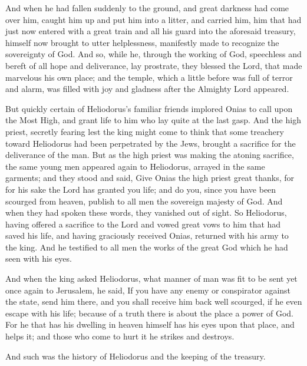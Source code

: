 {And when he had fallen suddenly to the ground, and great darkness had come over him,
{} caught him up and put him into a litter,
and carried him, him that had just now entered with a great train and all his guard into the aforesaid treasury, himself now brought to utter helplessness, manifestly made to recognize the sovereignty of God.
And so, while he, through the working of God, speechless and bereft of all hope and deliverance, lay prostrate,
they blessed the Lord, that made marvelous his own place; and the temple, which a little before was full of terror and alarm, was filled with joy and gladness after the Almighty Lord appeared.
\par }{\PP {}But quickly certain of Heliodorus’s familiar friends implored Onias to call upon the Most High, and grant life to him who lay quite at the last gasp.
And the high priest, secretly fearing lest the king might come to think that some treachery toward Heliodorus had been perpetrated by the Jews, brought a sacrifice for the deliverance of the man.
But as the high priest was making the atoning sacrifice, the same young men appeared again to Heliodorus, arrayed in the same garments; and they stood and said, Give Onias the high priest great thanks, for for his sake the Lord has granted you life;
and do you, since you have been scourged from heaven, publish to all men the sovereign majesty of God. And when they had spoken these words, they vanished out of sight.
So Heliodorus, having offered a sacrifice to the Lord and vowed
 great vows to him that had saved his life, and having graciously received Onias, returned with his army to the king.
And he testified to all men the works of the
 great God which he had seen with his eyes.
\par }{\PP {}And when the king asked Heliodorus, what manner of man was fit to be sent yet once again to Jerusalem, he said,
If you have any enemy or conspirator against the state, send him there, and you shall receive him back well scourged, if he even escape with his life; because of a truth there is about the place a power of God.
For he that has his dwelling in heaven himself has his eyes upon that place, and helps it; and those who come to hurt it he strikes and destroys.
\par }{\PP {}And such was the history of Heliodorus and the keeping of the treasury.

}
